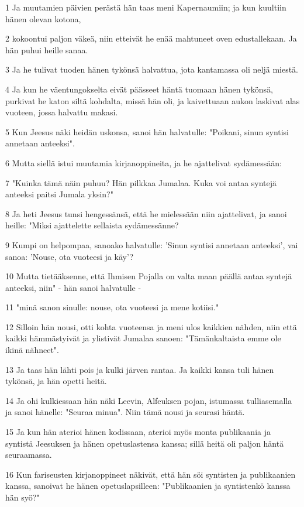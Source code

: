 \par 1 Ja muutamien päivien perästä hän taas meni Kapernaumiin; ja kun kuultiin hänen olevan kotona,
\par 2 kokoontui paljon väkeä, niin etteivät he enää mahtuneet oven edustallekaan. Ja hän puhui heille sanaa.
\par 3 Ja he tulivat tuoden hänen tykönsä halvattua, jota kantamassa oli neljä miestä.
\par 4 Ja kun he väentungokselta eivät päässeet häntä tuomaan hänen tykönsä, purkivat he katon siltä kohdalta, missä hän oli, ja kaivettuaan aukon laskivat alas vuoteen, jossa halvattu makasi.
\par 5 Kun Jeesus näki heidän uskonsa, sanoi hän halvatulle: "Poikani, sinun syntisi annetaan anteeksi".
\par 6 Mutta siellä istui muutamia kirjanoppineita, ja he ajattelivat sydämessään:
\par 7 "Kuinka tämä näin puhuu? Hän pilkkaa Jumalaa. Kuka voi antaa syntejä anteeksi paitsi Jumala yksin?"
\par 8 Ja heti Jeesus tunsi hengessänsä, että he mielessään niin ajattelivat, ja sanoi heille: "Miksi ajattelette sellaista sydämessänne?
\par 9 Kumpi on helpompaa, sanoako halvatulle: 'Sinun syntisi annetaan anteeksi', vai sanoa: 'Nouse, ota vuoteesi ja käy'?
\par 10 Mutta tietääksenne, että Ihmisen Pojalla on valta maan päällä antaa syntejä anteeksi, niin" - hän sanoi halvatulle -
\par 11 "minä sanon sinulle: nouse, ota vuoteesi ja mene kotiisi."
\par 12 Silloin hän nousi, otti kohta vuoteensa ja meni ulos kaikkien nähden, niin että kaikki hämmästyivät ja ylistivät Jumalaa sanoen: "Tämänkaltaista emme ole ikinä nähneet".
\par 13 Ja taas hän lähti pois ja kulki järven rantaa. Ja kaikki kansa tuli hänen tykönsä, ja hän opetti heitä.
\par 14 Ja ohi kulkiessaan hän näki Leevin, Alfeuksen pojan, istumassa tulliasemalla ja sanoi hänelle: "Seuraa minua". Niin tämä nousi ja seurasi häntä.
\par 15 Ja kun hän aterioi hänen kodissaan, aterioi myös monta publikaania ja syntistä Jeesuksen ja hänen opetuslastensa kanssa; sillä heitä oli paljon häntä seuraamassa.
\par 16 Kun fariseusten kirjanoppineet näkivät, että hän söi syntisten ja publikaanien kanssa, sanoivat he hänen opetuslapsilleen: "Publikaanien ja syntistenkö kanssa hän syö?"
